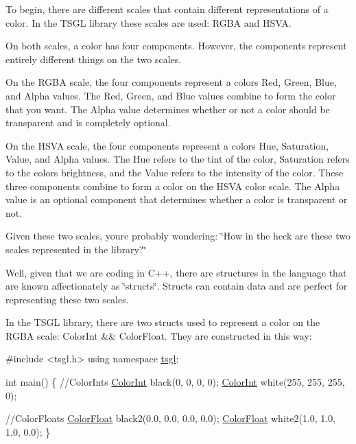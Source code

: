 To begin, there are different scales that contain different representations of a color. In the T\+S\+G\+L library these scales are used\+: R\+G\+B\+A and H\+S\+V\+A.

On both scales, a color has four components. However, the components represent entirely different things on the two scales.

On the R\+G\+B\+A scale, the four components represent a color\textquotesingle{}s Red, Green, Blue, and Alpha values. The Red, Green, and Blue values combine to form the color that you want. The Alpha value determines whether or not a color should be transparent and is completely optional.

On the H\+S\+V\+A scale, the four components represent a color\textquotesingle{}s Hue, Saturation, Value, and Alpha values. The Hue refers to the tint of the color, Saturation refers to the color\textquotesingle{}s brightness, and the Value refers to the intensity of the color. These three components combine to form a color on the H\+S\+V\+A color scale. The Alpha value is an optional component that determines whether a color is transparent or not.

Given these two scales, you\textquotesingle{}re probably wondering\+: \char`\"{}\+How in the heck are these two scales represented in the library?\char`\"{}

Well, given that we are coding in C++, there are structures in the language that are known affectionately as \char`\"{}structs\char`\"{}. Structs can contain data and are perfect for representing these two scales.

In the T\+S\+G\+L library, there are two structs used to represent a color on the R\+G\+B\+A scale\+: Color\+Int \&\& Color\+Float. They are constructed in this way\+:


\begin{DoxyCode}
\textcolor{preprocessor}{#include <tsgl.h>}
\textcolor{keyword}{using namespace }\hyperlink{namespacetsgl}{tsgl};

\textcolor{keywordtype}{int} main() \{
  \textcolor{comment}{//ColorInts}
  \hyperlink{structtsgl_1_1_color_int}{ColorInt} black(0, 0, 0, 0);
  \hyperlink{structtsgl_1_1_color_int}{ColorInt} white(255, 255, 255, 0);

  \textcolor{comment}{//ColorFloats}
  \hyperlink{structtsgl_1_1_color_float}{ColorFloat} black2(0.0, 0.0, 0.0, 0.0);
  \hyperlink{structtsgl_1_1_color_float}{ColorFloat} white2(1.0, 1.0, 1.0, 0.0);
\}
\end{DoxyCode}


